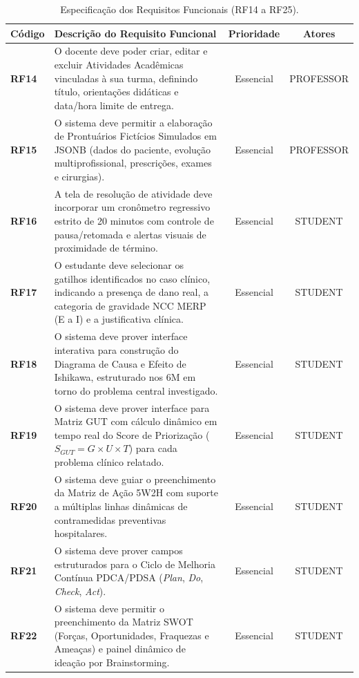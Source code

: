 \begin{table}[htb]
\centering
\small
\caption{Especificação dos Requisitos Funcionais (RF14 a RF25).}
\label{tab_rf_1_14}
\label{tab_rf_14_25}
\begin{tabularx}{\textwidth}{l X c c}
\toprule
\textbf{Código} & \textbf{Descrição do Requisito Funcional} & \textbf{Prioridade} & \textbf{Atores} \\
\midrule
\textbf{RF14} & O docente deve poder criar, editar e excluir Atividades Acadêmicas vinculadas à sua turma, definindo título, orientações didáticas e data/hora limite de entrega. & Essencial & PROFESSOR \\
\midrule
\textbf{RF15} & O sistema deve permitir a elaboração de Prontuários Fictícios Simulados em JSONB (dados do paciente, evolução multiprofissional, prescrições, exames e cirurgias). & Essencial & PROFESSOR \\
\midrule
\textbf{RF16} & A tela de resolução de atividade deve incorporar um cronômetro regressivo estrito de 20 minutos com controle de pausa/retomada e alertas visuais de proximidade de término. & Essencial & STUDENT \\
\midrule
\textbf{RF17} & O estudante deve selecionar os gatilhos identificados no caso clínico, indicando a presença de dano real, a categoria de gravidade NCC MERP (E a I) e a justificativa clínica. & Essencial & STUDENT \\
\midrule
\textbf{RF18} & O sistema deve prover interface interativa para construção do Diagrama de Causa e Efeito de Ishikawa, estruturado nos 6M em torno do problema central investigado. & Essencial & STUDENT \\
\midrule
\textbf{RF19} & O sistema deve prover interface para Matriz GUT com cálculo dinâmico em tempo real do Score de Priorização ($S_{GUT} = G \times U \times T$) para cada problema clínico relatado. & Essencial & STUDENT \\
\midrule
\textbf{RF20} & O sistema deve guiar o preenchimento da Matriz de Ação 5W2H com suporte a múltiplas linhas dinâmicas de contramedidas preventivas hospitalares. & Essencial & STUDENT \\
\midrule
\textbf{RF21} & O sistema deve prover campos estruturados para o Ciclo de Melhoria Contínua PDCA/PDSA (\textit{Plan}, \textit{Do}, \textit{Check}, \textit{Act}). & Essencial & STUDENT \\
\midrule
\textbf{RF22} & O sistema deve permitir o preenchimento da Matriz SWOT (Forças, Oportunidades, Fraquezas e Ameaças) e painel dinâmico de ideação por Brainstorming. & Essencial & STUDENT \\

\end{tabularx}
\end{table}
